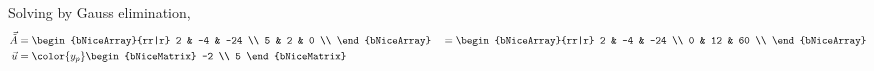 \begin{enumerate}
          Solving by Gauss elimination,
          \begin{align}
              \vec{\tilde{A}} & =  \begin{bNiceArray}{rr|r}
                                       2 & -4 & -24 \\
                                       5 & 2  & 0   \\
                                   \end{bNiceArray}       &
                              & = \begin{bNiceArray}{rr|r}
                                      2 & -4 & -24 \\
                                      0 & 12 & 60  \\
                                  \end{bNiceArray}        \\
              \vec{u}         & = \color{y_p} \begin{bNiceMatrix}
                                                  -2 \\ 5
                                              \end{bNiceMatrix}
          \end{align}


\end{enumerate}
